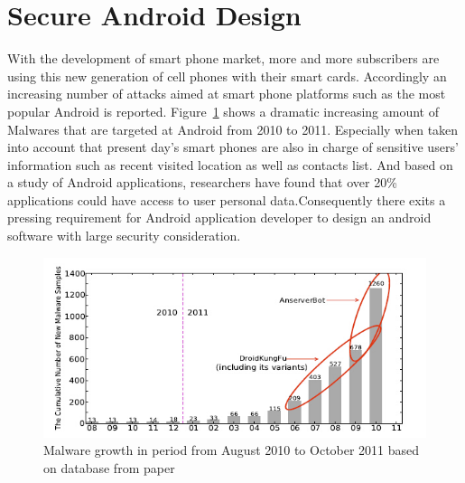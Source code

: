 \section{Secure Android Design}
With the development of smart phone market, more and more subscribers are using this new generation of cell phones with their smart cards. Accordingly an increasing number of attacks aimed at smart phone platforms such as the most popular Android is reported. Figure~\ref{fig:android-malware} shows a dramatic increasing amount of Malwares that are targeted at Android from 2010 to 2011\cite{android_malware}. Especially when taken into account that present day's smart phones are also in charge of sensitive users' information such as recent visited location as well as contacts list.  And based on a study of Android applications, researchers have found that over 20\% applications could have access to user personal data\cite{android_secure_design}.Consequently there exits a pressing requirement for Android application developer to design an android software with large security consideration. 
 \begin{figure}[!htbp]
	\centering
	\includegraphics[width=1.0\textwidth]{android-malware.jpg}
		\caption{Malware growth in period from August 2010 to October 2011 based on database from paper\cite{android_malware}}
	\label{fig:android-malware}
\end{figure}

